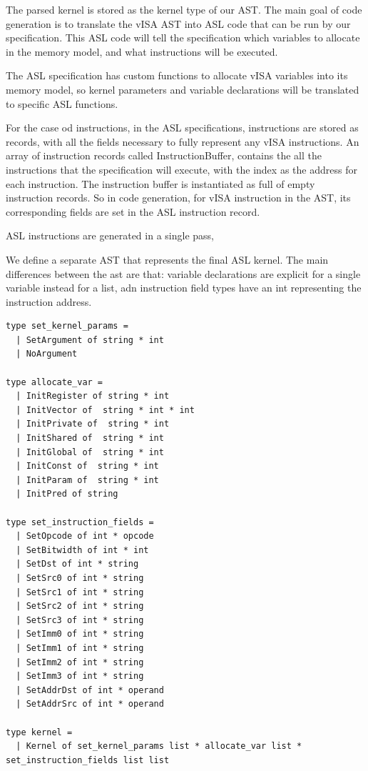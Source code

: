 The parsed kernel is stored as the kernel type of our AST. The main goal of
code generation is to translate the vISA AST into ASL code that can be run by
our specification. This ASL code will tell the specification which variables to
allocate in the memory model, and what instructions will be executed.

The ASL specification has custom functions to allocate vISA variables into its
memory model, so kernel parameters and variable declarations will be translated
to specific ASL functions.

For the case od instructions, in the ASL specifications, instructions are
stored as records, with all the fields necessary to fully represent any vISA
instructions. An array of instruction records called InstructionBuffer,
contains the all the instructions that the specification will execute, with the
index as the address for each instruction. The instruction buffer is
instantiated as full of empty instruction records. So in code generation, for
vISA instruction in the AST, its corresponding fields are set in the ASL
instruction record.

ASL instructions are generated in a single pass,

We define a separate AST that represents the final ASL kernel. The main
differences between the ast are that: variable declarations are explicit for a
single variable instead for a list, adn instruction field types have an int
representing the instruction address.

\begin{lstlisting}
type set_kernel_params =
  | SetArgument of string * int
  | NoArgument

type allocate_var = 
  | InitRegister of string * int
  | InitVector of  string * int * int
  | InitPrivate of  string * int
  | InitShared of  string * int
  | InitGlobal of  string * int
  | InitConst of  string * int
  | InitParam of  string * int
  | InitPred of string

type set_instruction_fields =
  | SetOpcode of int * opcode
  | SetBitwidth of int * int
  | SetDst of int * string
  | SetSrc0 of int * string
  | SetSrc1 of int * string
  | SetSrc2 of int * string
  | SetSrc3 of int * string
  | SetImm0 of int * string
  | SetImm1 of int * string
  | SetImm2 of int * string
  | SetImm3 of int * string
  | SetAddrDst of int * operand
  | SetAddrSrc of int * operand

type kernel = 
  | Kernel of set_kernel_params list * allocate_var list * set_instruction_fields list list

\end{lstlisting}

